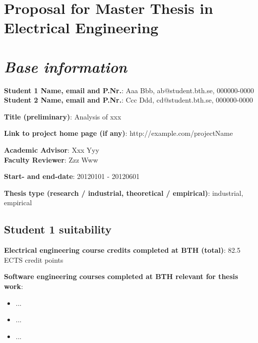 \documentclass[10pt,english,a4paper]{article}
\newcommand{\sunnyLine}{\vspace{16pt}}
\begin{document}


\section*{Proposal for Master Thesis in Electrical Engineering}


\section*{\large\textit{Base information}}

\noindent
\textbf{Student 1 Name, email and P.Nr.}: Aaa Bbb, ab@student.bth.se, 000000-0000 \\
\textbf{Student 2 Name, email and P.Nr.}: Ccc Ddd, cd@student.bth.se, 000000-0000  
\sunnyLine{}

\noindent\textbf{Title (preliminary)}: Analysis of xxx
\sunnyLine{}

\noindent\textbf{Link to project home page (if any)}: http://example.com/projectName
\sunnyLine{}

\noindent
\textbf{Academic Advisor}: Xxx Yyy \\
\textbf{Faculty Reviewer}:  Zzz Www
\sunnyLine{}

\noindent\textbf{Start- and end-date}: 20120101 - 20120601
\sunnyLine{}

\noindent\textbf{Thesis type (research / industrial, theoretical / empirical)}: industrial, empirical
\sunnyLine{}

\subsection*{Student 1 suitability}
\noindent\textbf{Electrical engineering course credits completed at BTH (total)}: 82.5 ECTS credit points
\sunnyLine{}

\noindent\textbf{Software engineering courses completed at BTH relevant for thesis work}:
\begin{itemize}
\item{...}
\item{...}
\item{...}
\end{itemize}
\end{document}
